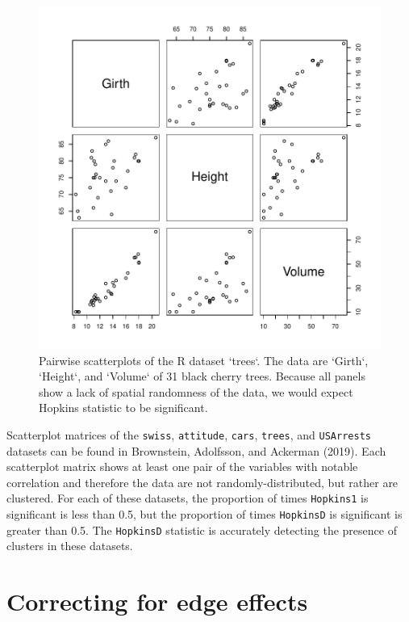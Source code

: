 \begin{figure}

{\centering \includegraphics[width=0.7\linewidth]{hopkins_files/figure-latex/trees-1} 

}

\caption{Pairwise scatterplots of the R dataset `trees`. The data are `Girth`, `Height`, and `Volume` of 31 black cherry trees. Because all panels show a lack of spatial randomness of the data, we would expect Hopkins statistic to be significant.}\label{fig:trees}
\end{figure}

Scatterplot matrices of the \texttt{swiss}, \texttt{attitude}, \texttt{cars}, \texttt{trees}, and \texttt{USArrests} datasets can be found in Brownstein, Adolfsson, and Ackerman (2019). Each scatterplot matrix shows at least one pair of the variables with notable correlation and therefore the data are not randomly-distributed, but rather are clustered. For each of these datasets, the proportion of times \texttt{Hopkins1} is significant is less than 0.5, but the proportion of times \texttt{HopkinsD} is significant is greater than 0.5. The \texttt{HopkinsD} statistic is accurately detecting the presence of clusters in these datasets.

\hypertarget{correcting-for-edge-effects}{%
\section{Correcting for edge effects}\label{correcting-for-edge-effects}}

